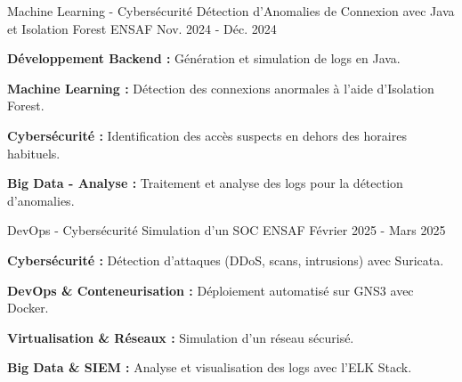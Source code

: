 \begin{cventries}
  \cventry
  {Machine Learning - Cybersécurité}
  {Détection d'Anomalies de Connexion avec Java et Isolation Forest} %
  {ENSAF} %
  {Nov. 2024 - Déc. 2024} %
  {
    \begin{cvitems} %
      \item {
                  \textbf{Développement Backend :}
                  Génération et simulation de logs en Java.}
      \item {
                  \textbf{Machine Learning :}
                  Détection des connexions anormales à l’aide d’Isolation Forest.}
      \item {
                  \textbf{Cybersécurité :}
                  Identification des accès suspects en dehors des horaires habituels.}
      \item {
                  \textbf{Big Data - Analyse :}
                  Traitement et analyse des logs pour la détection d’anomalies.}
    \end{cvitems}
  }

  \cventry
  {DevOps - Cybersécurité}
  {Simulation d’un SOC} %
  {ENSAF} %
  {Février 2025 - Mars 2025} %
  {
    \begin{cvitems} %
      \item {
                  \textbf{Cybersécurité :}
                  Détection d’attaques (DDoS, scans, intrusions) avec Suricata.}
      \item {
                  \textbf{DevOps \& Conteneurisation :}
                  Déploiement automatisé sur GNS3 avec Docker.}
      \item {
                  \textbf{Virtualisation \& Réseaux :}
                  Simulation d’un réseau sécurisé.}
      \item {
                  \textbf{Big Data \& SIEM :}
                  Analyse et visualisation des logs avec l’ELK Stack.}
    \end{cvitems}
  }

\end{cventries}
